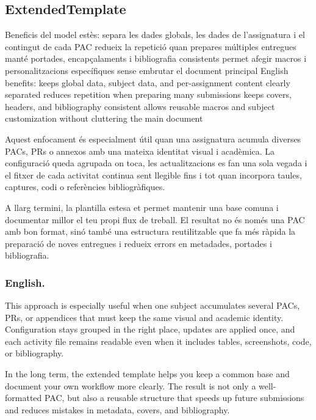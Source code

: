 	\newpage
	\subsection{ExtendedTemplate}
	\begin{itemize}
		\itembf Beneficis del model estès:
			\subitem separa les dades globals, les dades de l'assignatura i el contingut de cada PAC
			\subitem redueix la repetició quan prepares múltiples entregues
			\subitem manté portades, encapçalaments i bibliografia consistents
			\subitem permet afegir macros i personalitzacions específiques sense embrutar el document principal
		\itembf English benefits:
			\subitem keeps global data, subject data, and per-assignment content clearly separated
			\subitem reduces repetition when preparing many submissions
			\subitem keeps covers, headers, and bibliography consistent
			\subitem allows reusable macros and subject customization without cluttering the main document
	\end{itemize}


	Aquest enfocament és especialment útil quan una assignatura acumula diverses PACs, PRs o annexos amb una mateixa identitat visual i acadèmica. La configuració queda agrupada on toca, les actualitzacions es fan una sola vegada i el fitxer de cada activitat continua sent llegible fins i tot quan incorpora taules, captures, codi o referències bibliogràfiques.

	A llarg termini, la plantilla estesa et permet mantenir una base comuna i documentar millor el teu propi flux de treball. El resultat no és només una PAC amb bon format, sinó també una estructura reutilitzable que fa més ràpida la preparació de noves entregues i redueix errors en metadades, portades i bibliografia.

	\subsubsection*{English.}
		This approach is especially useful when one subject accumulates several PACs, PRs, or appendices that must keep the same visual and academic identity. Configuration stays grouped in the right place, updates are applied once, and each activity file remains readable even when it includes tables, screenshots, code, or bibliography.

		In the long term, the extended template helps you keep a common base and document your own workflow more clearly. The result is not only a well-formatted PAC, but also a reusable structure that speeds up future submissions and reduces mistakes in metadata, covers, and bibliography.


